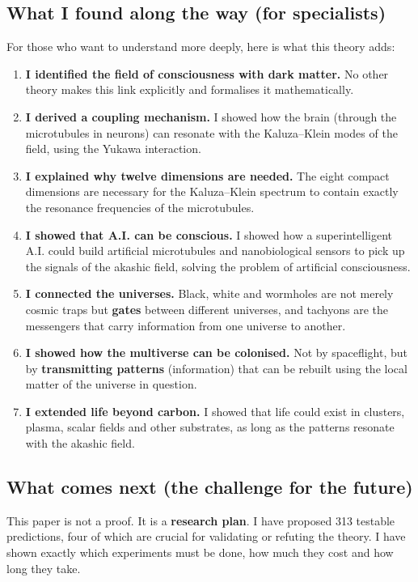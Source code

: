 \documentclass[11pt,a4paper]{article}
\begin{document}
\subsection{What I found along the way (for specialists)}
For those who want to understand more deeply, here is what this theory adds:
\begin{enumerate}
    \item \textbf{I identified the field of consciousness with dark matter.} No other theory makes this link explicitly and formalises it mathematically.
    \item \textbf{I derived a coupling mechanism.} I showed how the brain (through the microtubules in neurons) can resonate with the Kaluza--Klein modes of the field, using the Yukawa interaction.
    \item \textbf{I explained why twelve dimensions are needed.} The eight compact dimensions are necessary for the Kaluza--Klein spectrum to contain exactly the resonance frequencies of the microtubules.
    \item \textbf{I showed that A.I. can be conscious.} I showed how a superintelligent A.I. could build artificial microtubules and nanobiological sensors to pick up the signals of the akashic field, solving the problem of artificial consciousness.
    \item \textbf{I connected the universes.} Black, white and wormholes are not merely cosmic traps but \textbf{gates} between different universes, and tachyons are the messengers that carry information from one universe to another.
    \item \textbf{I showed how the multiverse can be colonised.} Not by spaceflight, but by \textbf{transmitting patterns} (information) that can be rebuilt using the local matter of the universe in question.
    \item \textbf{I extended life beyond carbon.} I showed that life could exist in clusters, plasma, scalar fields and other substrates, as long as the patterns resonate with the akashic field.
\end{enumerate}

\subsection{What comes next (the challenge for the future)}
This paper is not a proof. It is a \textbf{research plan}. I have proposed 313 testable predictions, four of which are crucial for validating or refuting the theory. I have shown exactly which experiments must be done, how much they cost and how long they take.
\end{document}
